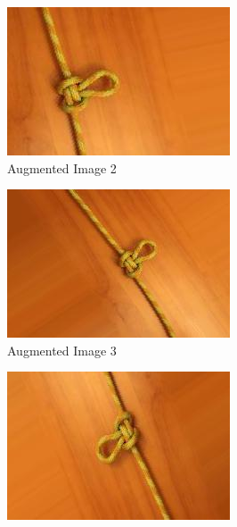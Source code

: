 \documentclass{l4proj}
\begin{document}
\begin{figure}[h]
\begin{subfigure}{.33\textwidth}
		\centering
        \includegraphics[width=\linewidth]{augmented2}
        \caption{Augmented Image 2}
        \label{fig:Aug2}
	\end{subfigure}
	\begin{subfigure}{.33\textwidth}
		\centering
        \includegraphics[width=\linewidth]{augmented3}
        \caption{Augmented Image 3}
        \label{fig:Aug3}
	\end{subfigure}
	\begin{subfigure}{.33\textwidth}
		\centering
        \includegraphics[width=\linewidth]{augmented4}

\end{subfigure}
\end{figure}
\end{document}

